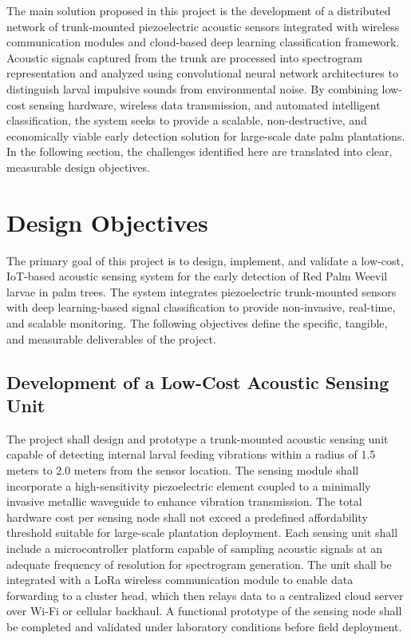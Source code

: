 \documentclass[12pt,a4paper,oneside]{memoir}
\begin{document}
The main solution proposed in this project is the development of a distributed network of trunk-mounted piezoelectric acoustic sensors integrated with wireless communication modules and cloud-based deep learning classification framework. Acoustic signals captured from the trunk are processed into spectrogram representation and analyzed using convolutional neural network architectures to distinguish larval impulsive sounds from environmental noise. By combining low-cost sensing hardware, wireless data transmission, and automated intelligent classification, the system seeks to provide a scalable, non-destructive, and economically viable early detection solution for large-scale date palm plantations. In the following section, the challenges identified here are translated into clear, measurable design objectives.
 
\section{Design Objectives}
\label{sec:Objectives}
 
The primary goal of this project is to design, implement, and validate a low-cost, IoT-based acoustic sensing system for the early detection of Red Palm Weevil larvae in palm trees. The system integrates piezoelectric trunk-mounted sensors with deep learning-based signal classification to provide non-invasive, real-time, and scalable monitoring. The following objectives define the specific, tangible, and measurable deliverables of the project.
 
\subsection{Development of a Low-Cost Acoustic Sensing Unit}
 
The project shall design and prototype a trunk-mounted acoustic sensing unit capable of detecting internal larval feeding vibrations within a radius of 1.5 meters to 2.0 meters from the sensor location. The sensing module shall incorporate a high-sensitivity piezoelectric element coupled to a minimally invasive metallic waveguide to enhance vibration transmission. The total hardware cost per sensing node shall not exceed a predefined affordability threshold suitable for large-scale plantation deployment. Each sensing unit shall include a microcontroller platform capable of sampling acoustic signals at an adequate frequency of resolution for spectrogram generation. The unit shall be integrated with a LoRa wireless communication module to enable data forwarding to a cluster head, which then relays data to a centralized cloud server over Wi-Fi or cellular backhaul. A functional prototype of the sensing node shall be completed and validated under laboratory conditions before field deployment.
 
\end{document}
